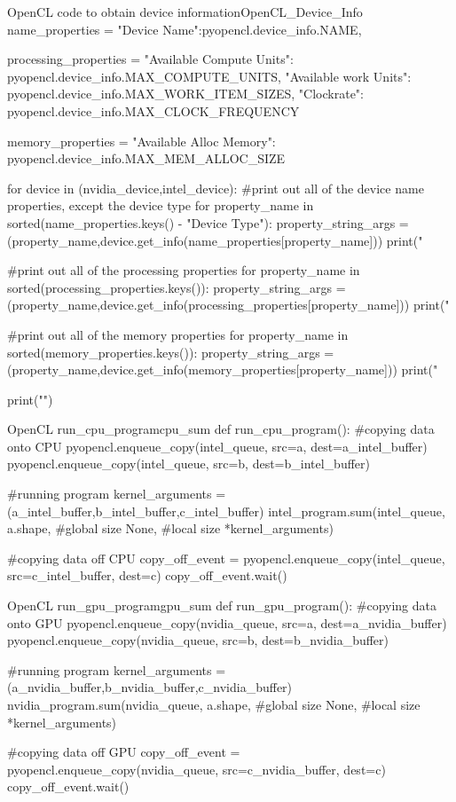 \begin{OpenCL_float}{OpenCL code to obtain device information}{OpenCL_Device_Info}
name_properties = {
	"Device Name":pyopencl.device_info.NAME,
}

processing_properties = {
	"Available Compute Units": pyopencl.device_info.MAX_COMPUTE_UNITS,
	"Available work Units": pyopencl.device_info.MAX_WORK_ITEM_SIZES,
	"Clockrate": pyopencl.device_info.MAX_CLOCK_FREQUENCY
}

memory_properties = {
	"Available Alloc Memory": pyopencl.device_info.MAX_MEM_ALLOC_SIZE
}

for device in (nvidia_device,intel_device):
	#print out all of the device name properties, except the device type
	for property_name in sorted(name_properties.keys() - {"Device Type"}):
		property_string_args =\\
		(property_name,device.get_info(name_properties[property_name]))
		print("%

	#print out all of the processing properties
	for property_name in sorted(processing_properties.keys()):
		property_string_args =\\
		(property_name,device.get_info(processing_properties[property_name]))
		print("%
	
	#print out all of the memory properties
	for property_name in sorted(memory_properties.keys()):
		property_string_args =\\
		(property_name,device.get_info(memory_properties[property_name]))
		print("%
	
	print("\n")
\end{OpenCL_float}

\begin{Python}{OpenCL run_cpu_program}{cpu_sum}
def run_cpu_program():
	#copying data onto CPU
	pyopencl.enqueue_copy(intel_queue,
	src=a,
	dest=a_intel_buffer)
	pyopencl.enqueue_copy(intel_queue,
	src=b,
	dest=b_intel_buffer)
	
	#running program
	kernel_arguments = (a_intel_buffer,b_intel_buffer,c_intel_buffer) 
	intel_program.sum(intel_queue,
	a.shape, #global size
	None, #local size
	*kernel_arguments)
	
	#copying data off CPU
	copy_off_event = pyopencl.enqueue_copy(intel_queue,
	src=c_intel_buffer,
	dest=c)
	copy_off_event.wait()
\end{Python}


\begin{Python}{OpenCL run_gpu_program}{gpu_sum}
def run_gpu_program():
	#copying data onto GPU
	pyopencl.enqueue_copy(nvidia_queue,
	src=a,
	dest=a_nvidia_buffer)
	pyopencl.enqueue_copy(nvidia_queue,
	src=b,
	dest=b_nvidia_buffer)
	
	#running program
	kernel_arguments = (a_nvidia_buffer,b_nvidia_buffer,c_nvidia_buffer) 
	nvidia_program.sum(nvidia_queue,
	a.shape, #global size
	None, #local size
	*kernel_arguments)
	
	#copying data off GPU
	copy_off_event = pyopencl.enqueue_copy(nvidia_queue,
	src=c_nvidia_buffer,
	dest=c)
	copy_off_event.wait()
\end{Python}

